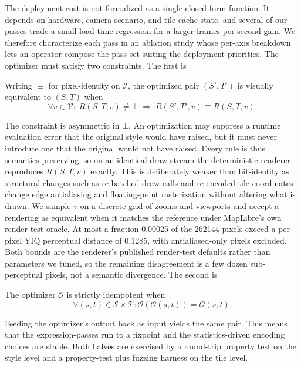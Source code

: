 The deployment cost is not formalized as a single closed-form function.
It depends on hardware, camera scenario, and tile cache state, and several of our passes trade a small load-time regression for a larger frames-per-second gain.
We therefore characterize each pass in an ablation study whose per-axis breakdown lets an operator compose the pass set suiting the deployment priorities.
\newpage
The optimizer must satisfy two constraints. The first is
\begin{definition}\label{def:visual_equivalence}
Writing $\equiv$ for pixel-identity on $\mathcal{I}$, the optimized pair $(S', T')$ is visually equivalent to $(S, T)$ when
\begin{equation}\label{eq:visual_equivalence}
    \forall v \in \mathcal{V}:\; R(S, T, v) \neq \bot \;\Rightarrow\; R(S', T', v) \equiv R(S, T, v).
\end{equation}
\end{definition}
The constraint is asymmetric in $\bot$.
An optimization may suppress a runtime evaluation error that the original style would have raised, but it must never introduce one that the original would not have raised.
Every rule is thus semantics-preserving, so on an identical draw stream the deterministic renderer reproduces $R(S, T, v)$ exactly.
This is deliberately weaker than bit-identity as structural changes such as re-batched draw calls and re-encoded tile coordinates change edge antialiasing and floating-point rasterization without altering what is drawn.
We sample $v$ on a discrete grid of zooms and viewports and accept a rendering as equivalent when it matches the reference under MapLibre's own render-test oracle.
At most a fraction \num{0.00025} of the \num{262144} pixels exceed a per-pixel YIQ perceptual distance of \num{0.1285}, with antialiased-only pixels excluded.
Both bounds are the renderer's published render-test defaults rather than parameters we tuned, so the remaining disagreement is a few dozen sub-perceptual pixels, not a semantic divergence.
The second is
\begin{definition}\label{def:idempotency}
The optimizer $\mathcal{O}$ is strictly idempotent when
\begin{equation}\label{eq:idempotency}
    \forall (s, t) \in \mathcal{S} \times \mathcal{T}: \mathcal{O}(\mathcal{O}(s, t)) = \mathcal{O}(s, t).
\end{equation}
\end{definition}
Feeding the optimizer's output back as input yields the same pair.
This means that the expression-passes run to a fixpoint and the statistics-driven encoding choices are stable.
Both halves are exercised by a round-trip property test on the style level and a property-test plus fuzzing harness on the tile level.

